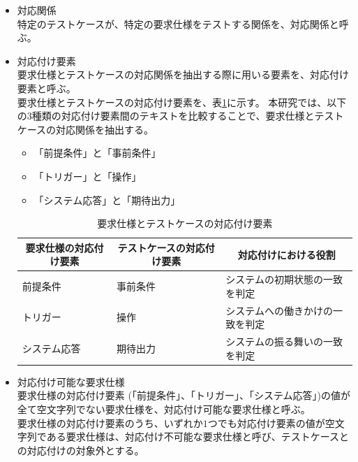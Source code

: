 \begin{itemize}
    \item 対応関係\\
    特定のテストケースが、特定の要求仕様をテストする関係を、対応関係と呼ぶ。

    \item 対応付け要素\\
    要求仕様とテストケースの対応関係を抽出する際に用いる要素を、対応付け要素と呼ぶ。\\
    要求仕様とテストケースの対応付け要素を、表\ref{tb:traceability}に示す。
    本研究では、以下の3種類の対応付け要素間のテキストを比較することで、要求仕様とテストケースの対応関係を抽出する。

    \begin{itemize}
        \item 「前提条件」と「事前条件」
        \item 「トリガー」と「操作」
        \item 「システム応答」と「期待出力」
    \end{itemize}

    \begin{table}[tp]
        \caption{要求仕様とテストケースの対応付け要素}\label{tb:traceability}
        \centering
        \begin{tabular}{l|l|l}
            \multicolumn{1}{c|}{要求仕様の対応付け要素} & \multicolumn{1}{c|}{テストケースの対応付け要素} & \multicolumn{1}{c}{対応付けにおける役割} \\
            \hline
            \hline
            前提条件 & 事前条件 & システムの初期状態の一致を判定 \\
            \hline
            トリガー & 操作 & システムへの働きかけの一致を判定 \\
            \hline
            システム応答 & 期待出力 & システムの振る舞いの一致を判定 \\
            \hline
        \end{tabular}
    \end{table}

    \item 対応付け可能な要求仕様\\
    要求仕様の対応付け要素 (「前提条件」、「トリガー」、「システム応答」)の値が全て空文字列でない要求仕様を、対応付け可能な要求仕様と呼ぶ。\\
    要求仕様の対応付け要素のうち、いずれか$1$つでも対応付け要素の値が空文字列である要求仕様は、対応付け不可能な要求仕様と呼び、テストケースとの対応付けの対象外とする。


\end{itemize}
